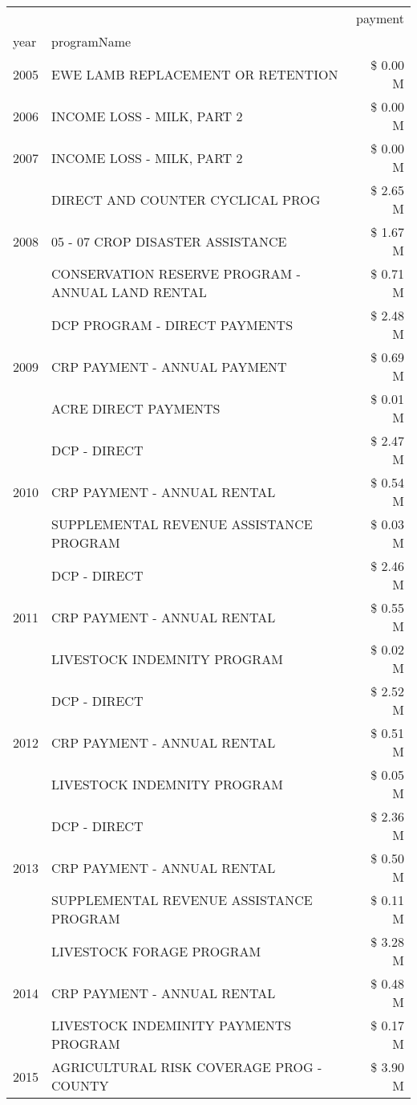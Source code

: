 \begin{tabular}{llr}
\toprule
 &  & payment \\
year & programName &  \\
\midrule
2005 & EWE LAMB REPLACEMENT OR RETENTION & \$ 0.00 M \\
\cline{1-3}
2006 & INCOME LOSS - MILK, PART 2 & \$ 0.00 M \\
\cline{1-3}
2007 & INCOME LOSS - MILK, PART 2 & \$ 0.00 M \\
\cline{1-3}
\multirow[t]{3}{*}{2008} & DIRECT AND COUNTER CYCLICAL PROG & \$ 2.65 M \\
 & 05 - 07 CROP DISASTER ASSISTANCE & \$ 1.67 M \\
 & CONSERVATION RESERVE PROGRAM - ANNUAL LAND RENTAL & \$ 0.71 M \\
\cline{1-3}
\multirow[t]{3}{*}{2009} & DCP PROGRAM - DIRECT PAYMENTS & \$ 2.48 M \\
 & CRP PAYMENT - ANNUAL PAYMENT & \$ 0.69 M \\
 & ACRE DIRECT PAYMENTS & \$ 0.01 M \\
\cline{1-3}
\multirow[t]{3}{*}{2010} & DCP - DIRECT & \$ 2.47 M \\
 & CRP PAYMENT - ANNUAL RENTAL & \$ 0.54 M \\
 & SUPPLEMENTAL REVENUE ASSISTANCE PROGRAM & \$ 0.03 M \\
\cline{1-3}
\multirow[t]{3}{*}{2011} & DCP - DIRECT & \$ 2.46 M \\
 & CRP PAYMENT - ANNUAL RENTAL & \$ 0.55 M \\
 & LIVESTOCK INDEMNITY PROGRAM & \$ 0.02 M \\
\cline{1-3}
\multirow[t]{3}{*}{2012} & DCP - DIRECT & \$ 2.52 M \\
 & CRP PAYMENT - ANNUAL RENTAL & \$ 0.51 M \\
 & LIVESTOCK INDEMNITY PROGRAM & \$ 0.05 M \\
\cline{1-3}
\multirow[t]{3}{*}{2013} & DCP - DIRECT & \$ 2.36 M \\
 & CRP PAYMENT - ANNUAL RENTAL & \$ 0.50 M \\
 & SUPPLEMENTAL REVENUE ASSISTANCE PROGRAM & \$ 0.11 M \\
\cline{1-3}
\multirow[t]{3}{*}{2014} & LIVESTOCK FORAGE PROGRAM & \$ 3.28 M \\
 & CRP PAYMENT - ANNUAL RENTAL & \$ 0.48 M \\
 & LIVESTOCK INDEMINITY PAYMENTS PROGRAM & \$ 0.17 M \\
\cline{1-3}
\multirow[t]{3}{*}{2015} & AGRICULTURAL RISK COVERAGE PROG - COUNTY & \$ 3.90 M \\

\end{tabular}
